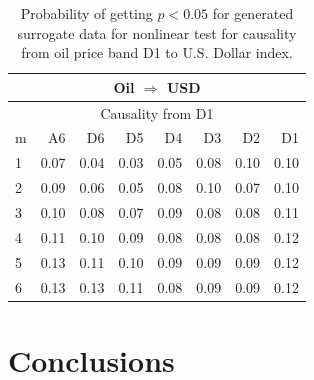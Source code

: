 %
%
\begin{table}[H]
\begin{center}
\begin{tabular}{l|r r r r r r r}
\hline\hline
\multicolumn{8}{c}{Oil $\Rightarrow$ USD}\\
\hline
\multicolumn{8}{c}{Causality from D1}\\
\hline\hline
m & A6 & D6 & D5 & D4 & D3 & D2 & D1 \\
\hline
1 & 0.07 & 0.04 & 0.03 & 0.05 & 0.08 & 0.10 & 0.10 \\
2 & 0.09 & 0.06 & 0.05 & 0.08 & 0.10 & 0.07 & 0.10 \\
3 & 0.10 & 0.08 & 0.07 & 0.09 & 0.08 & 0.08 & 0.11 \\
4 & 0.11 & 0.10 & 0.09 & 0.08 & 0.08 & 0.08 & 0.12 \\
5 & 0.13 & 0.11 & 0.10 & 0.09 & 0.09 & 0.09 & 0.12 \\
6 & 0.13 & 0.13 & 0.11 & 0.08 & 0.09 & 0.09 & 0.12 \\
\hline\hline
\end{tabular}
\caption{Probability of getting $p < 0.05$ for generated surrogate data for nonlinear test for causality from oil price band D1 to U.S. Dollar index.}
\end{center}
\end{table}

\section{Conclusions} \label{sec:conclusions}

